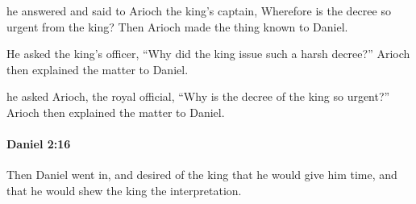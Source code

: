 			\begin{versebox}
					\item[BHS] 
					\item[LXX] 
					\item[ASV] he answered and said to Arioch the king's captain, Wherefore is the decree so urgent from the king? Then Arioch made the thing known to Daniel.
					\item[NIV] He asked the king’s officer, “Why did the king issue such a harsh decree?” Arioch then explained the matter to Daniel.
					\item[NRSV] he asked Arioch, the royal official, “Why is the decree of the king so urgent?” Arioch then explained the matter to Daniel.
			\end{versebox}

		\paragraph{Daniel 2:16} %
			\label{DANIEL-2-16}

			Then Daniel went in, and desired of the king that he would give him time, and that he would shew the king the interpretation.

